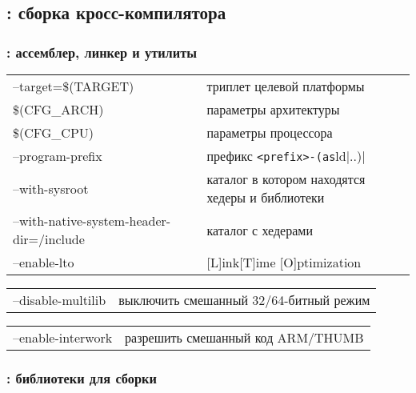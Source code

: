 
\subsection{: сборка кросс-компилятора} \label{aztc}


\subsubsection{: ассемблер, линкер и утилиты} \label{azbinutils}

\begin{tabular}{l l}
--target=\$(TARGET)& триплет целевой платформы\\
\$(CFG\_ARCH)&параметры архитектуры\\
\$(CFG\_CPU)&параметры процессора\\
--program-prefix&префикс \verb|<prefix>-(as|ld|..)|\\
--with-sysroot& каталог в котором находятся хедеры и библиотеки\\
--with-native-system-header-dir=/include&каталог с хедерами\\
--enable-lto&[L]ink[T]ime [O]ptimization\\
\end{tabular}

\clearpage
{}

\begin{tabular}{l l}
--disable-multilib&выключить смешанный 32/64-битный режим\\
\end{tabular}


\begin{tabular}{l l}
--enable-interwork&разрешить смешанный код ARM/THUMB\\
\end{tabular}


\subsubsection{: библиотеки для сборки } \label{azcclibs}

  


